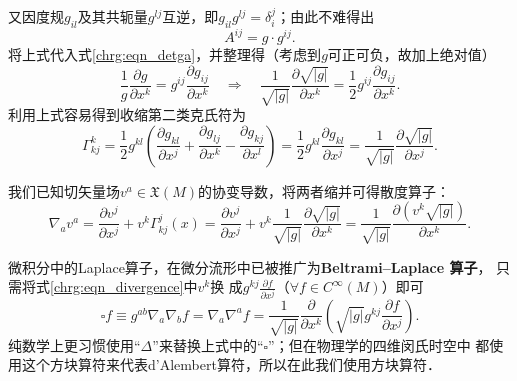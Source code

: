 又因度规$g_{il}$及其共轭量$g^{lj}$互逆，即$g_{il}g^{lj}=\delta_i^j$；由此不难得出
\begin{equation}
    A^{ij}=g\cdot g^{ij} .
\end{equation}
将上式代入式\eqref{chrg:eqn_detga}，并整理得（考虑到$g$可正可负，故加上绝对值）
\begin{equation}\label{chrg:eqn_detgijij}
    \frac{1}{g}\frac{\partial g}{\partial x^k}= g^{ij} \frac{\partial g_{ij}}{\partial x^k}
    \quad \Rightarrow \quad
    \frac{1}{\sqrt{|g|}}\frac{\partial \sqrt{|g|}}{\partial x^k}=
     \frac{1}{2}g^{ij} \frac{\partial g_{ij}}{\partial x^k} .
\end{equation}
利用上式容易得到{\heiti 收缩第二类克氏符}为
\begin{equation}\label{chrg:eqn_Gamma-KKJ}
    \Gamma^k_{kj} = \frac{1}{2}{g^{kl}}\left( \frac{\partial g_{kl}}{\partial x^j}
        + \frac{\partial g_{lj}}{\partial x^k}  - \frac{\partial g_{kj}} {\partial x^l} \right)
    = \frac{1}{2}{g^{kl}}\frac{\partial g_{kl}}{\partial x^j}
    =\frac{1}{\sqrt{|g|}}\frac{\partial \sqrt{|g|}}{\partial x^j} .
\end{equation}



我们已知切矢量场$v^a\in \mathfrak{X}(M)$的协变导数，将两者缩并可得{\heiti 散度算子}：
\begin{equation}\label{chrg:eqn_divergence}
    \nabla_a v^a = \frac{\partial v^j}{\partial x^j} +v^k \Gamma_{kj}^{j}(x)
    = \frac{\partial v^j}{\partial x^j} +v^k \frac{1}{\sqrt{|g|}}\frac{\partial \sqrt{|g|}}{\partial x^k}
    =\frac{1}{\sqrt{|g|}}\frac{ \partial \left(v^k\sqrt{|g|}\right)}{\partial x^k} . 
\end{equation}

微积分中的Laplace算子，在微分流形中已被推广为{\bfseries Beltrami--Laplace 算子}，
只需将式\eqref{chrg:eqn_divergence}中$v^k$换
成$g^{kj} \frac{ \partial f}{\partial x^j}$（$\forall f \in C^\infty(M)$）即可
\begin{equation}\label{chrg:eqn_Beltrami-Laplace}
    \square f \equiv g^{ab} \nabla_a \nabla_b f = \nabla_a \nabla^a f 
    = \frac{1}{\sqrt{|g|}}\frac{ \partial }{\partial x^k}
    \left( \sqrt{|g|}g^{kj} \frac{ \partial f}{\partial x^j}  \right) .
\end{equation}
纯数学上更习惯使用“$\Delta$”来替换上式中的“$\square$”；但在物理学的四维闵氏时空中
都使用这个方块算符来代表d'Alembert算符，所以在此我们使用方块算符．








